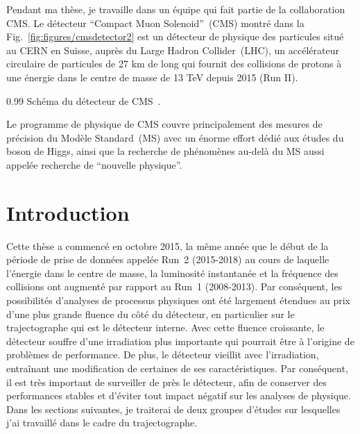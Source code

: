 \appendix
\renewcommand\chaptername{Appendix}                      %
\renewcommand\thechapter{\Alph{chapter}}                %
\renewcommand\thesection{\Alph{chapter}.\Roman{section}} %
\setcounter{chapter}{0}   

Pendant ma thèse, je travaille dans un équipe qui fait partie de la collaboration CMS. Le détecteur ``Compact Muon Solenoid''~(CMS) montré dans la Fig.~\ref{fig:figures/cmsdetector2} est un détecteur de physique des particules situé au CERN en Suisse, auprès du Large Hadron Collider~(LHC), un accélérateur circulaire de particules de 27 km de long qui fournit des collisions de protons à une énergie dans le centre de masse de 13 TeV depuis 2015 (Run II).

                 {0.99}       %
                 { Schéma du détecteur de CMS~\cite{website:CMSdet}. }


Le programme de physique de CMS couvre principalement des mesures de précision du Modèle Standard~(MS) avec un énorme effort dédié aux études du boson de Higgs, ainsi que la recherche de phénomènes au-delà du MS aussi appelée recherche de ``nouvelle physique''.

\section{Introduction}


Cette thèse a commencé en octobre 2015, la même année que le début de la période de prise de données appelée Run~2 (2015-2018) au cours de laquelle l’énergie dans le centre de masse, la luminosité instantanée et la fréquence des collisions ont augmenté par rapport au Run~1 (2008-2013). Par conséquent, les possibilités d'analyses de processus physiques ont été largement étendues au prix d'une plus grande fluence du côté du détecteur, en particulier sur le trajectographe qui est le détecteur interne. Avec cette fluence croissante, le détecteur souffre d’une irradiation plus importante qui pourrait être à l’origine de problèmes de performance. De plus, le détecteur vieillit avec l'irradiation, entraînant une modification de certaines de ses caractéristiques. Par conséquent, il est très important de surveiller de près le détecteur, afin de conserver des performances stables et d'éviter tout impact négatif sur les analyses de physique. Dans les sections suivantes, je traiterai de deux groupes d’études sur lesquelles j’ai travaillé dans le cadre du trajectographe.

